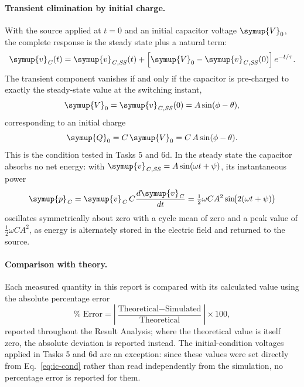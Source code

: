 \documentclass[12pt,a4paper]{article}
\begin{document}
	\paragraph{Transient elimination by initial charge.}
	With the source applied at $t = 0$ and an initial capacitor voltage
	$\symup{V}_{0}$, the complete response is the steady state plus a natural term:
	\begin{equation}
		\symup{v}_{\mathit{C}}(t) = \symup{v}_{\mathit{C,SS}}(t)
		+ \left[\symup{V}_{0} - \symup{v}_{\mathit{C,SS}}(0)\right] e^{-t/\tau}.
		\label{eq:complete-sine}
	\end{equation}
	The transient component vanishes if and only if the capacitor is
	pre-charged to exactly the steady-state value at the switching
	instant,
	\begin{equation}
		\symup{V}_{0} = \symup{v}_{\mathit{C,SS}}(0) = A \sin(\phi - \theta),
		\label{eq:ic-cond}
	\end{equation}
	corresponding to an initial charge
	\begin{equation}
		\symup{Q}_{0} = C\,\symup{V}_{0} = C\,A\sin(\phi - \theta).
		\label{eq:q0}
	\end{equation}
	This is the condition tested in Tasks 5 and 6d.  In the steady state
	the capacitor absorbs no net energy: with
	$\symup{v}_{\mathit{C,SS}} = A\sin(\omega t + \psi)$, its instantaneous power
	\begin{equation}
		\symup{p}_{\mathit{C}} = \symup{v}_{\mathit{C}}\,C\frac{d\symup{v}_{\mathit{C}}}{dt}
		= \tfrac{1}{2}\omega C A^{2}\sin\!\bigl(2(\omega t + \psi)\bigr)
		\label{eq:pcap}
	\end{equation}
	oscillates symmetrically about zero with a cycle mean of zero and a
	peak value of $\tfrac{1}{2}\omega C A^{2}$, as energy is alternately
	stored in the electric field and returned to the source.
	
	\paragraph{Comparison with theory.}
	Each measured quantity in this report is compared with its calculated
	value using the absolute percentage error
	\begin{equation}
		\% \text{ Error} =
		\left|\frac{\text{Theoretical} - \text{Simulated}}{\text{Theoretical}}\right|
		\times 100 ,
		\label{eq:perr}
	\end{equation}
	reported throughout the Result Analysis; where the theoretical value
	is itself zero, the absolute deviation is reported instead. The
	initial-condition voltages applied in Tasks 5 and 6d are an
	exception: since these values were set directly from
	Eq.~\eqref{eq:ic-cond} rather than read independently from the
	simulation, no percentage error is reported for them.
	
\end{document}
